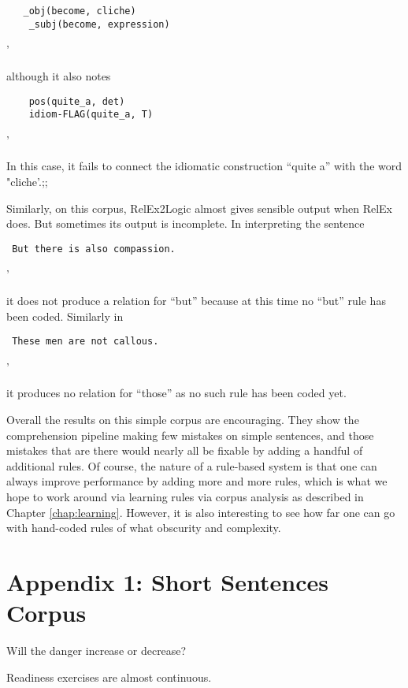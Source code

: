 \documentclass[11pt]{article}
\begin{document}
 \begin{verbatim}
   _obj(become, cliche)
    _subj(become, expression)
   \end{verbatim}'
     
although it also notes

 \begin{verbatim}
    pos(quite_a, det)
    idiom-FLAG(quite_a, T)
   \end{verbatim}'
     
\noindent In this case, it  fails to connect the idiomatic construction ``quite a'' with the word "cliche'.;;

 
 Similarly, on this corpus, RelEx2Logic almost gives sensible output when RelEx does.   But sometimes its output is incomplete.   In interpreting the sentence
 
  \begin{verbatim}
 But there is also compassion. 
    \end{verbatim}'
 
 \noindent it does not produce a relation for ``but'' because at this time no ``but'' rule has been coded.   Similarly in
 
  \begin{verbatim}
 These men are not callous.
    \end{verbatim}'
 
 \noindent it produces no relation for ``those'' as no such rule has been coded yet.
 
 Overall the results on this simple corpus are encouraging.  They show the comprehension pipeline making few mistakes on simple sentences, and those mistakes that are there would nearly all be fixable by adding a handful of additional rules.   Of course, the nature of a rule-based system is that one can always improve performance by adding more and more rules, which is what we hope to work around via learning rules via corpus analysis as described in Chapter \ref{chap:learning}.   However, it is also interesting to see how far one can go with hand-coded rules of what obscurity and complexity.
 
 
 
 \section*{Appendix 1: Short Sentences Corpus}
 
Will the danger increase or decrease?
 
Readiness exercises  are almost continuous. 
\end{document}
